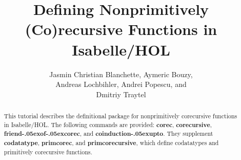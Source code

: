 \documentclass[12pt,a4paper]{article} %
\title{%
Defining Nonprimitively (Co)recursive Functions in Isabelle/HOL}
\author{Jasmin Christian Blanchette, Aymeric Bouzy, \\
Andreas Lochbihler, Andrei Popescu, and \\
Dmitriy Traytel}
\renewcommand\_{\hbox{\textunderscore\kern-.05ex}}
\newcommand{\keyw}[1]{\textbf{#1}}
\begin{document}
\maketitle

\begin{sloppy}
\begin{abstract}
\noindent
This tutorial describes the definitional package for nonprimitively corecursive functions
in Isabelle/HOL. The following commands are provided:
\keyw{corec}, \keyw{corecursive}, \keyw{friend\_of\_corec}, and \keyw{coinduction\_\allowbreak upto}.
They supplement \keyw{codatatype}, \keyw{primcorec}, and \keyw{primcorecursive}, which
define codatatypes and primitively corecursive functions.
\end{abstract}
\end{sloppy}

\tableofcontents



\let\em=\sl
{}

\end{document}

